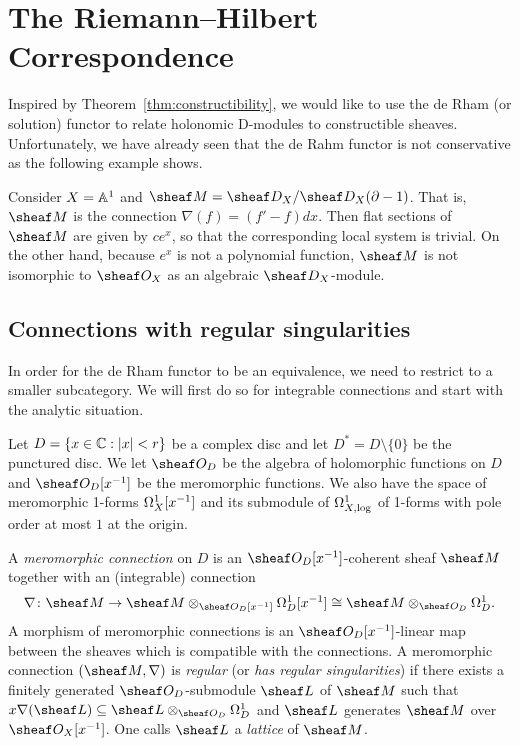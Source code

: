 \documentclass[number-in-sections,a4paper]{notes}
\begin{document}
\section{The Riemann--Hilbert Correspondence}

Inspired by Theorem~\ref{thm:constructibility}, we would like to use the de Rham (or solution) functor to relate holonomic D-modules to constructible sheaves.
Unfortunately, we have already seen that the de Rahm functor is not conservative as the following example shows.

\begin{Example}
    Consider $X = \mathbb A^{1}_{}$ and $\sheaf M = \sD_X/\sD_X(\partial - 1)$.
    That is, $\sheaf M$ is the connection $\nabla(f) = (f' - f)dx$.
    Then flat sections of $\sheaf M$ are given by $ce^x$, so that the corresponding local system is trivial.
    On the other hand, because $e^x$ is not a polynomial function, $\sheaf M$ is not isomorphic to $\sO_X$ as an algebraic $\sD_X$-module.
\end{Example}

\subsection{Connections with regular singularities}

In order for the de Rham functor to be an equivalence, we need to restrict to a smaller subcategory.
We will first do so for integrable connections and start with the analytic situation.

Let $D = \{ x \in {\mathbb{C}} : |x| < r \}$ be a complex disc and let $D^* = D \setminus \{0\}$ be the punctured disc.
We let $\sO_D$ be the algebra of holomorphic functions on $D$ and $\sO_D[x^{-1}]$ be the meromorphic functions.
We also have the space of meromorphic 1-forms $\Omega^1_{X}[x^{-1}]$ and its submodule of $\Omega^1_{X,\log}$ of 1-forms with pole order at most $1$ at the origin.

\begin{Definition}
    A \emph{meromorphic connection} on $D$ is an $\sO_D[x^{-1}]$-coherent sheaf  $\sheaf M$ together with an (integrable) connection 
    \[
        \nabla\colon \sheaf M \to \sheaf M \otimes_{\sO_D[x^{-1}]} \ctb D[x^{-1}] \cong \sheaf M \otimes_{\sO_D} \ctb{D}.
    \]
    A morphism of meromorphic connections is an $\sO_D[x^{-1}]$-linear map between the sheaves which is compatible with the connections.
    A meromorphic connection $(\sheaf M, \nabla)$ is \emph{regular} (or \emph{has regular singularities}) if there exists a finitely generated $\sO_D$-submodule $\sheaf L$ of $\sheaf M$ such that $x\nabla(\sheaf L) \subseteq \sheaf L \otimes_{\sO_D} \ctb{D}$ and $\sheaf L$ generates $\sheaf M$ over $\sO_X[x^{-1}]$.
    One calls $\sheaf L$ a \emph{lattice} of $\sheaf M$.
\end{Definition}
\end{document}
